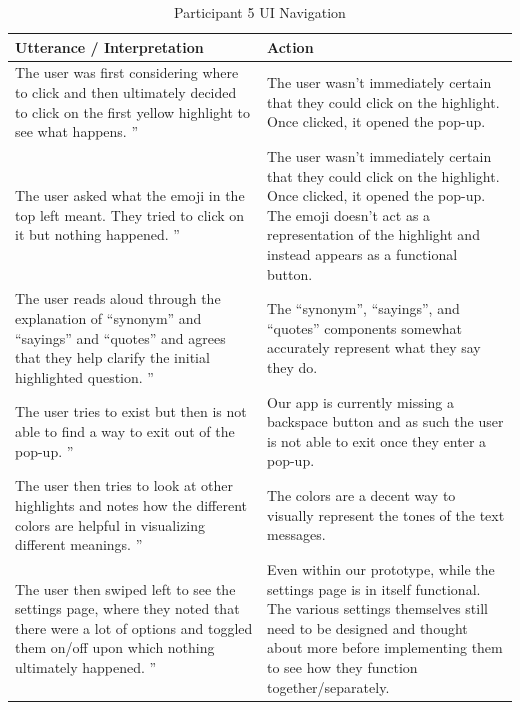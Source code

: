 \documentclass[acmsmall,screen,authorversion,nonacm]{acmart}
\begin{document}
\begin{table}[H]
\begin{tabular}{|p{0.5 \linewidth}|p{0.5 \linewidth}|}
\hline
Utterance / Interpretation & Action                                               \\ \hline
The user was first considering where
to click and then ultimately decided to
click on the first yellow highlight to see what happens. '' & The user wasn’t immediately certain
that they could click on the highlight.
Once clicked, it opened the pop-up.
\\ \hline
The user asked what the emoji in the
top left meant. They tried to click on it
but nothing happened. '' & The user wasn’t immediately certain
that they could click on the highlight.
Once clicked, it opened the pop-up. The emoji doesn’t act as a representation
of the highlight and instead appears as a
functional button.
\\ \hline
The user reads aloud through the
explanation of “synonym” and
“sayings” and “quotes” and agrees
that they help clarify the initial
highlighted question. '' & The “synonym”, “sayings”, and “quotes”
components somewhat accurately represent
what they say they do.
\\ \hline
The user tries to exist but then is not
able to find a way to exit out of the
pop-up. '' & Our app is currently missing a backspace
button and as such the user is not able to exit
once they enter a pop-up.
\\ \hline
The user then tries to look at other
highlights and notes how the different
colors are helpful in visualizing
different meanings. '' & The colors are a decent way to visually
represent the tones of the text messages.
\\ \hline
The user then swiped left to see the
settings page, where they noted that
there were a lot of options and toggled
them on/off upon which nothing
ultimately happened. '' & Even within our prototype, while the
settings page is in itself functional. The
various settings themselves still need to be
designed and thought about more before
implementing them to see how they function
together/separately.
\\ \hline
\end{tabular}
\caption{Participant 5 UI Navigation}
\label{tab:SimpUser5Task1}
\end{table}
\end{document}
